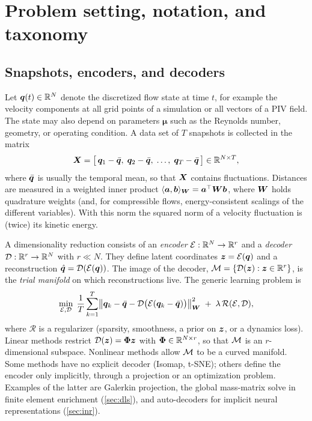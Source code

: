 \section{Problem setting, notation, and taxonomy}
\label{sec:formulation}

\subsection{Snapshots, encoders, and decoders}

Let $\bm{q}(t)\in\mathbb{R}^{N}$ denote the discretized flow state at time $t$, for example
the velocity components at all grid points of a simulation or all vectors of a
PIV field. The state may also depend on parameters $\bm{\mu}$ such as the
Reynolds number, geometry, or operating condition. A data set of $T$ snapshots
is collected in the matrix
\begin{equation}
  \bm{X} = \bigl[\,\bm{q}_1-\bar{\bm{q}},\;\bm{q}_2-\bar{\bm{q}},\;\dots,\;\bm{q}_T-\bar{\bm{q}}\,\bigr]\in\mathbb{R}^{N\times T},
  \label{eq:snapshots}
\end{equation}
where $\bar{\bm{q}}$ is usually the temporal mean, so that $\bm{X}$ contains
fluctuations. Distances are measured in a weighted inner product
$\langle \bm{a},\bm{b}\rangle_{\bm{W}}=\bm{a}^{\top}\bm{W}\bm{b}$, where $\bm{W}$ holds
quadrature weights (and, for compressible flows, energy-consistent scalings of
the different variables). With this norm the squared norm of a velocity
fluctuation is (twice) its kinetic energy.

A dimensionality reduction consists of an \emph{encoder}
$\mathcal{E}:\mathbb{R}^{N}\to\mathbb{R}^{r}$ and a \emph{decoder} $\mathcal{D}:\mathbb{R}^{r}\to\mathbb{R}^{N}$ with
$r\ll N$. They define latent coordinates $\bm{z}=\mathcal{E}(\bm{q})$ and a reconstruction
$\hat{\bm{q}}=\mathcal{D}(\mathcal{E}(\bm{q}))$. The image of the decoder,
$\mathcal{M}=\{\mathcal{D}(\bm{z}):\bm{z}\in\mathbb{R}^{r}\}$, is the \emph{trial manifold} on which
reconstructions live. The generic learning problem is
\begin{equation}
  \min_{\mathcal{E},\mathcal{D}}\;\frac{1}{T}\sum_{k=1}^{T}\bigl\|\bm{q}_k-\bar{\bm{q}}-\mathcal{D}\bigl(\mathcal{E}(\bm{q}_k-\bar{\bm{q}})\bigr)\bigr\|_{\bm{W}}^{2}
  \;+\;\lambda\,\mathcal{R}(\mathcal{E},\mathcal{D}),
  \label{eq:generic}
\end{equation}
where $\mathcal{R}$ is a regularizer (sparsity, smoothness, a prior on $\bm{z}$,
or a dynamics loss). Linear methods restrict $\mathcal{D}(\bm{z})=\bm{\Phi}\bm{z}$ with
$\bm{\Phi}\in\mathbb{R}^{N\times r}$, so that $\mathcal{M}$ is an $r$-dimensional subspace. Nonlinear
methods allow $\mathcal{M}$ to be a curved manifold. Some methods have no explicit
decoder (Isomap, t-SNE); others define the encoder only implicitly, through a
projection or an optimization problem. Examples of the latter are Galerkin
projection, the global mass-matrix solve in finite element enrichment
(\cref{sec:dls}), and auto-decoders for implicit neural representations
(\cref{sec:inr}).

